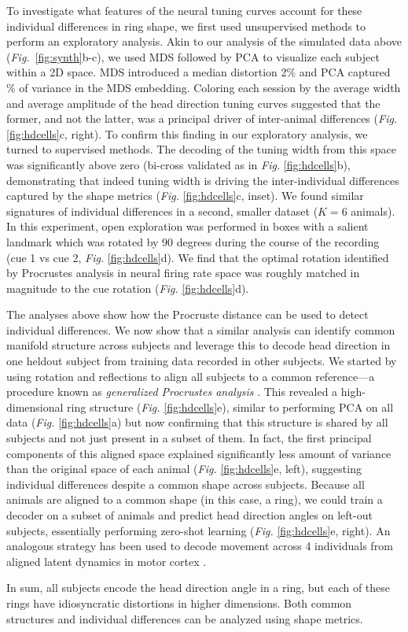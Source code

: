 To investigate what features of the neural tuning curves account for these individual differences in ring shape, we first used unsupervised methods to perform an exploratory analysis.
Akin to our analysis of the simulated data above (\textit{Fig.}~\ref{fig:synth}b-c), we used MDS followed by PCA to visualize each subject within a 2D space.
MDS introduced a median distortion \textapprox{}2\% and PCA captured \% of variance in the MDS embedding.
Coloring each session by the average width and average amplitude of the head direction tuning curves suggested that the former, and not the latter, was a principal driver of inter-animal differences (\textit{Fig.} \ref{fig:hdcells}c, right). 
To confirm this finding in our exploratory analysis, we turned to supervised methods.
The decoding of the tuning width from this space was significantly above zero (bi-cross validated as in \textit{Fig.} \ref{fig:hdcells}b), demonstrating that indeed tuning width is driving the inter-individual differences captured by the shape metrics (\textit{Fig.} \ref{fig:hdcells}c, inset). We found similar signatures of individual differences in a second, smaller dataset ($K = 6$ animals).
In this experiment, open exploration was performed in boxes with a salient landmark which was rotated by 90 degrees during the course of the recording (cue 1 vs cue 2, \textit{Fig.} \ref{fig:hdcells}d).
We find that the optimal rotation identified by Procrustes analysis in neural firing rate space was roughly matched in magnitude to the cue rotation (\textit{Fig.} \ref{fig:hdcells}d).

The analyses above show how the Procruste distance can be used to detect individual differences.
We now show that a similar analysis can identify common manifold structure across subjects and leverage this to decode head direction in one heldout subject from training data recorded in other subjects.
We started by using rotation and reflections to align all subjects to a common reference---a procedure known as \textit{generalized Procrustes analysis} \parencite{gower1975generalized}.
This revealed a high-dimensional ring structure (\textit{Fig.} \ref{fig:hdcells}e), similar to performing PCA on all data (\textit{Fig.} \ref{fig:hdcells}a) but now confirming that this structure is shared by all subjects and not just present in a subset of them. In fact, the first principal components of this aligned space explained significantly less amount of variance than the original space of each animal (\textit{Fig.} \ref{fig:hdcells}e, left), suggesting individual differences despite a common shape across subjects. Because all animals are aligned to a common shape (in this case, a ring), we could train a decoder on a subset of animals and predict head direction angles on left-out subjects, essentially performing zero-shot learning (\textit{Fig.} \ref{fig:hdcells}e, right). An analogous strategy has been used to decode movement across 4 individuals from aligned latent dynamics in motor cortex \parencite{safaie2023preserved}.

In sum, all subjects encode the head direction angle in a ring, but each of these rings have idiosyncratic distortions in higher dimensions. Both common structures and individual differences can be analyzed using shape metrics. 

